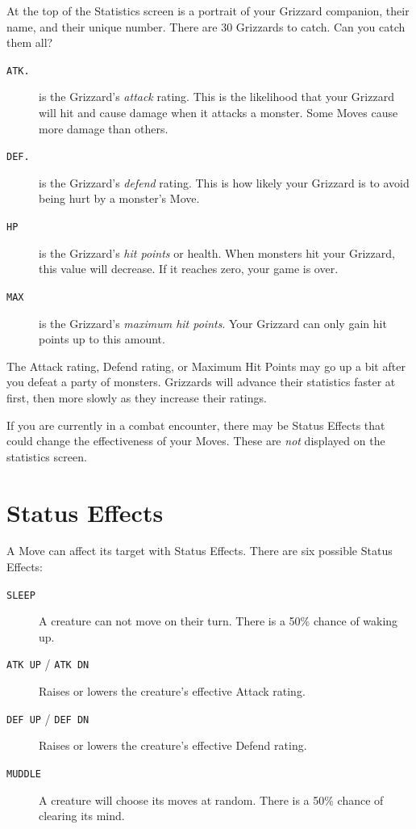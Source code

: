 \documentclass[10pt,twocolumn,openany,article]{memoir}
\begin{document}
At  the top  of the  Statistics screen  is a  portrait of  your Grizzard
companion, their name,  and their unique number. There  are 30 Grizzards
to catch. Can you catch them all?

\begin{description}
  
\item[\texttt{ATK.}] is the Grizzard's  \emph{attack} rating. This is the
  likelihood  that your  Grizzard  will  hit and  cause  damage when  it
  attacks a monster. Some Moves cause more damage than others.
  
\item[\texttt{DEF.}] is the Grizzard's \emph{defend} rating. This is how
  likely your Grizzard is to avoid being hurt by a monster's Move.

\item[\texttt{HP}]  is  the  Grizzard's  \emph{hit  points}  or  health.
  When  monsters hit  your Grizzard,  this  value will  decrease. If  it
  reaches zero, your game is over.

\item[\texttt{MAX}]  is   the  Grizzard's  \emph{maximum   hit  points}.
  Your Grizzard can only gain hit points up to this amount.
  
\end{description}

The Attack rating, Defend rating, or Maximum  Hit Points may go up a bit
after  you defeat  a party  of  monsters. Grizzards  will advance  their
statistics faster at first, then more slowly as they increase their ratings.

If you are currently in a  combat encounter, there may be Status Effects
that could change the effectiveness  of your Moves. These are \emph{not}
displayed on the statistics screen.

\section{Status Effects}\label{sec:StatusEffects}

A Move can affect its target with Status Effects. There are six possible
Status Effects:

\begin{description}
\item[\texttt{SLEEP}] A  creature can not  move on their turn.  There is
  a 50\% chance of waking up.
\item[\texttt{ATK UP} / \texttt{ATK DN}] Raises or lowers the creature's
  effective Attack rating.
\item[\texttt{DEF UP} / \texttt{DEF DN}] Raises or lowers the creature's
  effective Defend rating.
\item[\texttt{MUDDLE}]  A  creature will  choose  its  moves at  random.
  There is a 50\% chance of clearing its mind.
\end{description}
\end{document}

